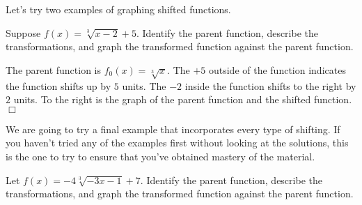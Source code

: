 \documentclass[lang=en,11pt]{elegantbook}
\begin{document}
Let's try two examples of graphing shifted functions.
\begin{example}
Suppose $f(x)=\sqrt[3]{x-2}+5$.  Identify the parent function, describe the transformations, and graph the transformed function against the parent function.
\end{example}
\begin{solution}
The parent function is $f_0(x)=\sqrt[3]{x}$.  The $+5$ outside of the function indicates the function shifts up by $5$ units.  The $-2$ inside the function shifts to the right by $2$ units.  To the right is the graph of the parent function and the shifted function.  $\Box$
\end{solution}
We are going to try a final example that incorporates every type of shifting.  If you haven't tried any of the examples first without looking at the solutions, this is the one to try to ensure that you've obtained mastery of the material.
\begin{example}
Let $f(x)=-4\sqrt[3]{-3x-1}+7$.  Identify the parent function, describe the transformations, and graph the transformed function against the parent function.
\end{example}
\end{document}
